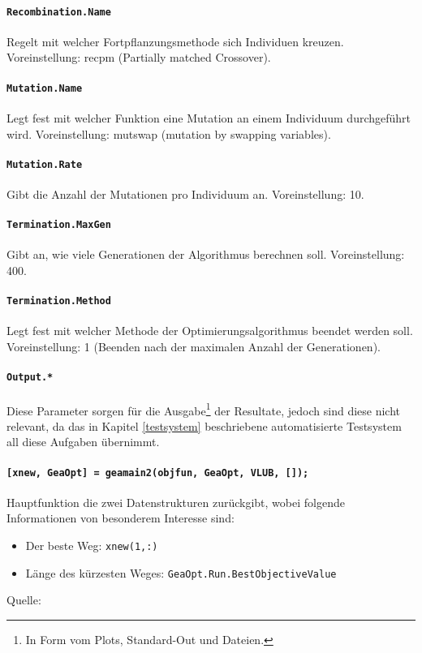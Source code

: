\paragraph{{\tt Recombination.Name}} Regelt mit welcher Fortpflanzungsmethode
sich Individuen kreuzen.
Voreinstellung: recpm (Partially matched Crossover).

\paragraph{{\tt Mutation.Name}} Legt fest mit welcher Funktion eine Mutation
an einem Individuum durchgeführt wird.
Voreinstellung: mutswap (mutation by swapping variables).

\paragraph{{\tt Mutation.Rate}} Gibt die Anzahl der Mutationen
pro Individuum an.
Voreinstellung: 10.

\paragraph{{\tt Termination.MaxGen}} Gibt an, wie viele Generationen der
Algorithmus berechnen soll.
Voreinstellung: 400.

\paragraph{{\tt Termination.Method}} Legt fest mit welcher Methode der
Optimierungsalgorithmus beendet werden soll.
Voreinstellung: 1 (Beenden nach der maximalen Anzahl der Generationen).

\paragraph{{\tt Output.*}} Diese Parameter sorgen für die
Ausgabe\footnote{In Form vom Plots, Standard-Out und Dateien.} der Resultate,
jedoch sind diese nicht relevant, da das in Kapitel \ref{testsystem} beschriebene
automatisierte Testsystem all diese Aufgaben übernimmt.

\paragraph{{\tt [xnew, GeaOpt] = geamain2(objfun, GeaOpt, VLUB, []);}}
Hauptfunktion die zwei Datenstrukturen zurückgibt, wobei folgende
Informationen von besonderem Interesse sind:

\begin{itemize}
  \item Der beste Weg: {\tt xnew(1,:)}
  \item Länge des kürzesten Weges: {\tt GeaOpt.Run.BestObjectiveValue}
\end{itemize}

\noindent Quelle: \citep{geatbx-options}

